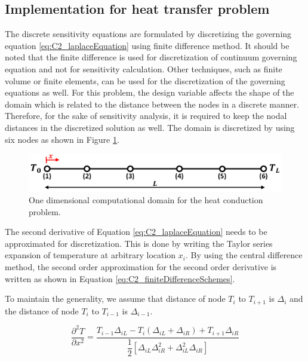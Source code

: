\subsection{Implementation for heat transfer problem}
The discrete sensitivity equations are formulated by discretizing the governing equation \eqref{eq:C2_laplaceEquation} using finite difference method. It should be noted that the finite difference is used for discretization of continuum governing equation and not for sensitivity calculation. Other techniques, such as finite volume or finite elements, can be used for the discretization of the governing equations as well. For this problem, the design variable affects the shape of the domain which is related to the distance between the nodes in a discrete manner. Therefore, for the sake of sensitivity analysis, it is required to keep the nodal distances in the discretized solution as well. The domain is discretized by using six nodes as shown in Figure \ref{fig:C2_discretizedDomain}.

\begin{figure}[h]
    \centering
    \includegraphics[width=14.00cm]{Chapter_2/figure/benchmark_case_computational_domain.png}
    \caption{One dimensional computational domain for the heat conduction problem.}
    \label{fig:C2_discretizedDomain}
\end{figure}

The second derivative of Equation \eqref{eq:C2_laplaceEquation} needs to be approximated for discretization. This is done by writing the Taylor series expansion of temperature at arbitrary location $x_i$. By using the central difference method, the second order approximation for the second order derivative is written as shown in Equation \eqref{eq:C2_finiteDifferenceSchemes}.

To maintain the generality, we assume that distance of node $T_i$ to $T_{i+1}$ is $\Delta_i$ and the distance of node $T_i$ to $T_{i-1}$ is $\Delta_{i-1}$.

\begin{equation}\label{eq:C2_finiteDifferenceSchemes}
    \frac{\partial^2 T}{\partial x^2} = 
    \frac{T_{i-1} \Delta_{iL} - 
          T_{i} (\Delta_{iL} + \Delta_{iR}) + 
          T_{i+1} \Delta_{iR}}
         {\dfrac{1}{2} \left[ \Delta_{iL} \Delta_{iR}^2 + 
                             \Delta_{iL}^2 \Delta_{iR} \right]}
\end{equation}

